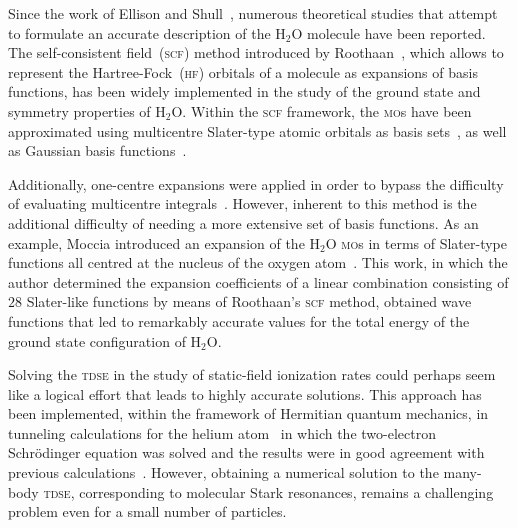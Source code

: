 

Since the work of Ellison and Shull~\cite{EllisonShullh2o_1955},
numerous theoretical studies that attempt to formulate an accurate
description of the H$_{2}$O molecule have been reported. The
self-consistent field~(\textsc{scf}) method introduced by
Roothaan~\cite{Roothaan_HF}, which allows to represent the
Hartree-Fock~(\textsc{hf}) orbitals of a molecule as expansions of
basis functions, has been widely implemented in the study of the
ground state and symmetry properties of H$_{2}$O. Within the
\textsc{scf} framework, the \textsc{mo}s have been approximated using
multicentre Slater-type atomic orbitals as basis
sets~\cite{Reeves_nature_1956,natureH2O_1960,Pitzer_1968,Pitzer_1970},
as well as Gaussian basis
functions~\cite{gaussianH2O_1965,Neumann_gaussian_1968}.

Additionally, one-centre expansions were applied in order to bypass
the difficulty of evaluating multicentre
integrals~\cite{Moccia_1964,oneCentre_1961,Parr_JCP_1960}. However,
inherent to this method is the additional difficulty of needing a more
extensive set of basis functions. As an example, Moccia introduced an
expansion of the H$_{2}$O \textsc{mo}s in terms of Slater-type
functions all centred at the nucleus of the oxygen
atom~\cite{Moccia_1964}. This work, in which the author determined the
expansion coefficients of a linear combination consisting of $28$
Slater-like functions by means of Roothaan's \textsc{scf} method,
obtained wave functions that led to remarkably accurate values for the
total energy of the ground state configuration of H$_{2}$O.


Solving the \textsc{tdse} in the study of static-field ionization
rates could perhaps seem like a logical effort that leads to highly
accurate solutions. This approach has been implemented, within the
framework of Hermitian quantum mechanics, in tunneling calculations
for the helium atom~\cite{static_tdse_He,static_tdse_He_method} in
which the two-electron Schr\"{o}dinger equation was solved and the
results were in good agreement with previous
calculations~\cite{static_He_scrinzi}. However, obtaining a numerical
solution to the many-body \textsc{tdse}, corresponding to molecular
Stark resonances, remains a challenging problem even for a small
number of particles.

